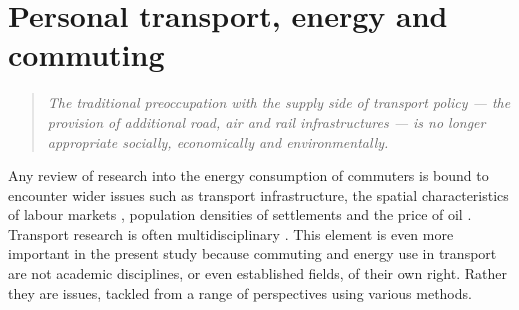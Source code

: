 
\chapter{Personal transport, energy and commuting}
\label{Chapter2}
\fancyhead[RE,LO]{\thepage}

\begin{quote}
\textit{The traditional preoccupation with the supply side of transport policy
---
the provision of additional road, air and rail infrastructures --- is no longer
appropriate socially, economically and environmentally.}
\end{quote}

Any review of research into the energy consumption of commuters is bound to
encounter wider issues such as transport infrastructure,
the spatial characteristics of labour markets \citep{Ballas2006}, population
densities of settlements \citep{Breheny1995}
and the price of oil \citep{Sexton2011}. Transport research is often
multidisciplinary \citep{Hoyle1992modern}. This element is even more important in
the present study because
commuting and energy use in transport are not academic disciplines, or even
established fields, of their own right. Rather they are issues, tackled from a
range of perspectives using various methods. 


